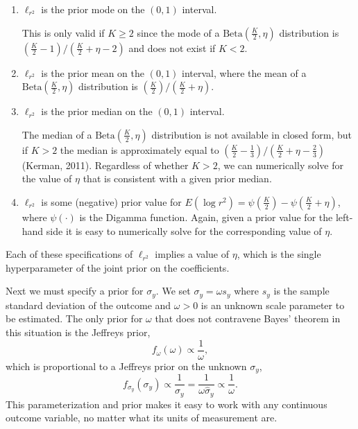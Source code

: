 \documentclass[11pt]{article}
\newcommand{\locRsq}{\ell_{r^2}}
\newcommand{\halfK}{\frac{K}{2}}
\newcommand{\Betadist}[2]{\mathrm{Beta}\left(#1,#2\right)}
\newcommand{\Digamma}[1]{\psi\left(#1\right)}
\begin{document}
\begin{enumerate}
\item $\locRsq$ is the prior mode on the $\left(0,1\right)$ interval.

This is only valid if $K \geq 2$ since the mode of a $\Betadist{\halfK}{\eta}$
distribution is \newline
$\left(\halfK - 1\right) / \left(\halfK + \eta - 2\right)$
and does not exist if $K < 2$.

\item $\locRsq$ is the prior mean on the $\left(0,1\right)$ interval, where
the mean of a $\Betadist{\halfK}{\eta}$ distribution is
$\left(\halfK\right) / \left(\halfK + \eta\right)$.

\item $\locRsq$ is the prior median on the $\left(0,1\right)$ interval.

The median of a $\Betadist{\halfK}{\eta}$ distribution is not available in
closed form, but if $K > 2$ the median is approximately equal to
$\left(\halfK - \frac{1}{3}\right) / \left(\halfK + \eta - \frac{2}{3}\right)$
(Kerman, 2011). Regardless of whether $K > 2$, we can numerically solve for the
value of $\eta$ that is consistent with a given prior median.

\item $\locRsq$ is some (negative) prior value for
$E\left(\log{r^2}\right) = \Digamma{\halfK} - \Digamma{\halfK + \eta}$,
where $\Digamma{\cdot}$ is the Digamma function. Again, given a prior value for
the left-hand side it is easy to numerically solve for the corresponding value
of $\eta$.
\end{enumerate}
%
Each of these specifications of $\locRsq$ implies a value of $\eta$,
which is the single hyperparameter of the joint prior on the coefficients.

Next we must specify a prior for $\sigma_y$. We set $\sigma_y = \omega s_y$
where $s_y$ is the sample standard deviation of the outcome and $\omega > 0$ is
an unknown scale parameter to be estimated. The only prior for $\omega$ that
does not contravene Bayes' theorem in this situation is the Jeffreys prior,
$$f_\omega \left(\omega\right) \propto \frac{1}{\omega},$$
which is proportional to a Jeffreys prior on the unknown $\sigma_y$,
$$f_{\sigma_y} \left(\sigma_y\right) \propto \frac{1}{\sigma_y}
= \frac{1}{\omega \widehat{\sigma}_y} \propto \frac{1}{\omega}.$$
This parameterization and prior makes it easy to work with any continuous
outcome variable, no matter what its units of measurement are.
\end{document}
